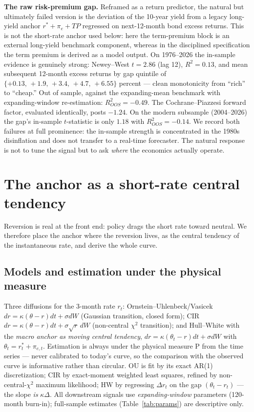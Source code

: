 \documentclass[11pt]{article}
\begin{document}
\textbf{The raw risk-premium gap.} Reframed as a return predictor, the natural but
ultimately failed version is the deviation of the 10-year yield from a legacy long-yield
anchor $r^*+\pi_e+TP$ regressed on next-12-month bond excess returns. This is not the
short-rate anchor used below: here the term-premium block is an external long-yield
benchmark component, whereas in the disciplined specification the term premium is derived
as a model output. On 1976--2026 the in-sample evidence is genuinely strong: Newey--West $t=2.86$ (lag 12), $R^2=0.13$, and mean
subsequent 12-month excess returns by gap quintile of
$\{+0.13,\,+1.9,\,+3.4,\,+4.7,\,+6.55\}$ percent --- clean monotonicity from ``rich'' to
``cheap.'' Out of sample, against the expanding-mean benchmark with expanding-window
re-estimation: $R^2_{OOS}=-0.49$. The Cochrane--Piazzesi forward factor, evaluated
identically, posts $-1.24$. On the modern subsample (2004--2026) the gap's in-sample
$t$-statistic is only $1.18$ with $R^2_{OOS}=-0.14$. We record both failures at full
prominence: the in-sample strength is concentrated in the 1980s disinflation and does not
transfer to a real-time forecaster. The natural response is not to tune the signal but to
ask \emph{where} the economics actually operate.

\section{The anchor as a short-rate central tendency}\label{sec:model}

Reversion is real at the front end: policy drags the short rate toward neutral. We
therefore place the anchor where the reversion lives, as the central tendency of the
instantaneous rate, and derive the whole curve.

\subsection{Models and estimation under the physical measure}

Three diffusions for the 3-month rate $r_t$:
Ornstein--Uhlenbeck/Vasicek $dr=\kappa(\theta-r)dt+\sigma dW$ (Gaussian transition, closed
form); CIR $dr=\kappa(\theta-r)dt+\sigma\sqrt{r}\,dW$ (non-central $\chi^2$ transition);
and Hull--White with the \emph{macro anchor as moving central tendency},
$dr=\kappa(\theta_t-r)dt+\sigma dW$ with $\theta_t=r^*_t+\pi_{e,t}$. Estimation is always
under the physical measure P from the time series --- never calibrated to today's curve, so
the comparison with the observed curve is informative rather than circular. OU is fit by
its exact AR(1) discretization; CIR by exact-moment weighted least squares, refined by
non-central-$\chi^2$ maximum likelihood; HW by regressing $\Delta r_t$ on the gap
$(\theta_t-r_t)$ --- the slope \emph{is} $\kappa\Delta$. All downstream signals use
\emph{expanding-window} parameters (120-month burn-in); full-sample estimates
(Table~\ref{tab:params}) are descriptive only.
\end{document}
